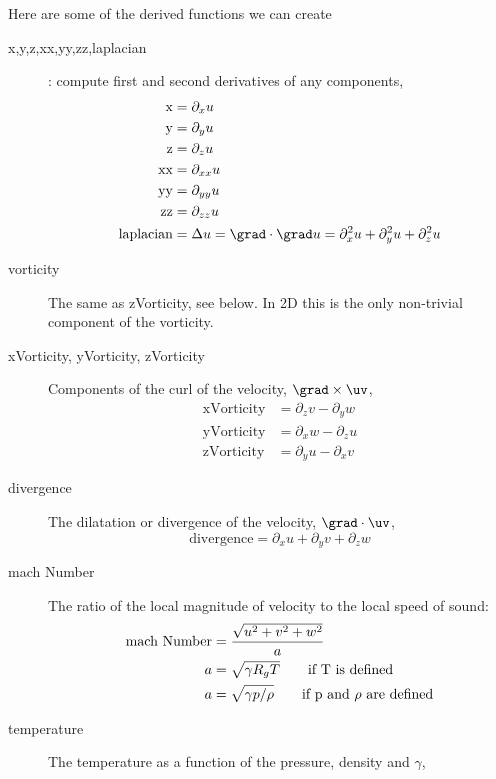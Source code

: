 \documentclass{article}
\begin{document}
Here are some of the derived functions we can create
\begin{description}
  \item[x,y,z,xx,yy,zz,laplacian] : compute first and second derivatives of any components,
     \begin{align*}
    \mbox{x} &= \partial_x u \\
    \mbox{y} &= \partial_{y} u \\
    \mbox{z} &= \partial_{z} u \\
    \mbox{xx} &= \partial_{xx} u \\
    \mbox{yy} &= \partial_{yy} u \\
    \mbox{zz} &= \partial_{zz} u \\
    \mbox{laplacian} &= \Delta u = \grad\cdot\grad u = \partial^2_x u + \partial^2_y u + \partial^2_z u
     \end{align*}
  \item[vorticity] The same as zVorticity, see below. In 2D this is the only non-trivial component of the vorticity.
  \item[xVorticity, yVorticity, zVorticity] Components of the curl of the velocity, $\grad\times\uv$,
     \begin{align*}
         \mbox{xVorticity} &= \partial_z v - \partial_y w  \\
         \mbox{yVorticity} &= \partial_x w - \partial_z u  \\
         \mbox{zVorticity} &= \partial_y u - \partial_x v 
    \end{align*}
  \item[divergence] The dilatation or divergence of the velocity, $\grad\cdot\uv$,
    \[
         \mbox{divergence} = \partial_x u + \partial_y v + \partial_z w
    \]
  \item[mach Number] The ratio of the local magnitude of velocity to the local speed of sound:
      \begin{align*}
        \mbox{mach Number} & = { \sqrt{ u^2 + v^2 + w^2 } \over a } \\
         a  & = \sqrt{ \gamma R_g T } \qquad \mbox{if T is defined} \\
         a  & = \sqrt{ \gamma p / \rho } \qquad \mbox{if p and $\rho$ are defined} \\
      \end{align*}
  \item[temperature] The temperature as a function of the pressure, density and $\gamma$,
     \[
\]
\end{description}
\end{document}
